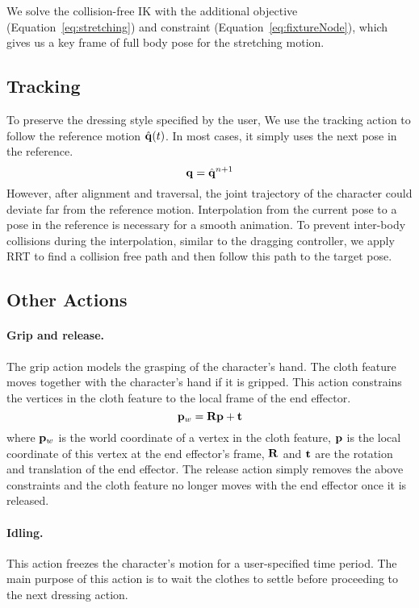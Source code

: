 We solve the collision-free IK with the additional objective (Equation~\ref{eq:stretching}) and constraint (Equation~\ref{eq:fixtureNode}), which gives us a key frame of full body pose for the stretching motion.


\subsection{Tracking}

To preserve the dressing style specified by the user, We use the tracking action to follow the reference motion $\hat{\mathbf{q}}(t)$. In most cases, it simply uses the next pose in the reference.
\begin{displaymath}
\mathbf{q} = \hat{\mathbf{q}}^{n+1}
\end{displaymath}
However, after alignment and traversal, the joint trajectory of the character could deviate far from the reference motion. Interpolation from the current pose to a pose in the reference is necessary for a smooth animation. To prevent inter-body collisions during the interpolation, similar to the dragging controller, we apply RRT \cite{} to find a collision free path and then follow this path to the target pose.

\subsection{Other Actions}

\paragraph{Grip and release.}
The grip action models the grasping of the character's hand. The cloth feature moves together with the character's hand if it is gripped. This action constrains the vertices in the cloth feature to the local frame of the end effector.
\begin{displaymath}
\mathbf{p}_w = \mathbf{Rp} + \mathbf{t}
\end{displaymath}
where $\mathbf{p}_w$ is the world coordinate of a vertex in the cloth feature, $\mathbf{p}$ is the local coordinate of this vertex at the end effector's frame, $\mathbf{R}$ and $\mathbf{t}$ are the rotation and translation of the end effector. The release action simply removes the above constraints and the cloth feature no longer moves with the end effector once it is released.

\paragraph{Idling.} This action freezes the character's motion for a user-specified time period. The main purpose of this action is to wait the clothes to settle before proceeding to the next dressing action.

